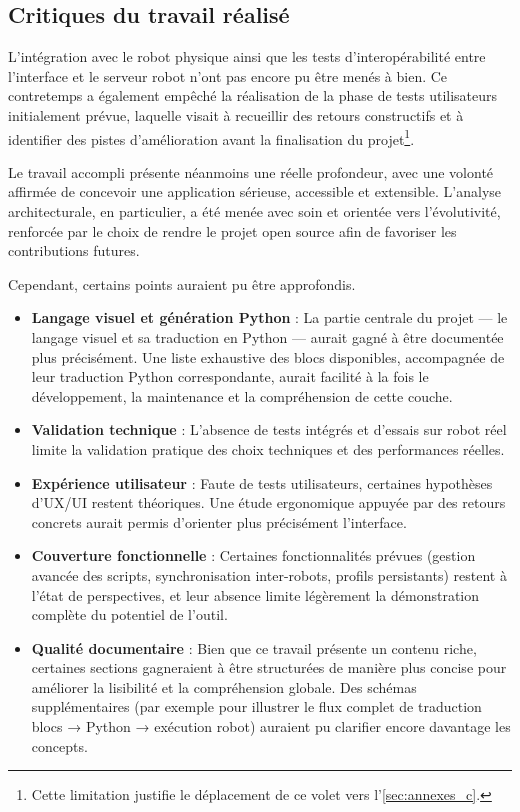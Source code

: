 \subsection{Critiques du travail réalisé} \label{sec:critiques}

L’intégration avec le robot physique ainsi que les tests d’interopérabilité entre l’interface et le serveur robot n’ont pas encore pu être menés à bien.
Ce contretemps a également empêché la réalisation de la phase de tests utilisateurs initialement prévue, laquelle visait à recueillir des retours constructifs et à identifier des pistes d’amélioration avant la finalisation du projet\footnote{Cette limitation justifie le déplacement de ce volet vers l'\autoref{sec:annexes_c}.}.

Le travail accompli présente néanmoins une réelle profondeur, avec une volonté affirmée de concevoir une application sérieuse, accessible et extensible.  
L’analyse architecturale, en particulier, a été menée avec soin et orientée vers l’évolutivité, renforcée par le choix de rendre le projet open source afin de favoriser les contributions futures.

Cependant, certains points auraient pu être approfondis.
\begin{itemize}
    \item \textbf{Langage visuel et génération Python} :  
    La partie centrale du projet — le langage visuel et sa traduction en Python — aurait gagné à être documentée plus précisément.  
    Une liste exhaustive des blocs disponibles, accompagnée de leur traduction Python correspondante, aurait facilité à la fois le développement, la maintenance et la compréhension de cette couche.
    
    \item \textbf{Validation technique} :  
    L’absence de tests intégrés et d’essais sur robot réel limite la validation pratique des choix techniques et des performances réelles.
    
    \item \textbf{Expérience utilisateur} :  
    Faute de tests utilisateurs, certaines hypothèses d’UX/UI restent théoriques. Une étude ergonomique appuyée par des retours concrets aurait permis d’orienter plus précisément l’interface.
    
    \item \textbf{Couverture fonctionnelle} :  
    Certaines fonctionnalités prévues (gestion avancée des scripts, synchronisation inter-robots, profils persistants) restent à l’état de perspectives, et leur absence limite légèrement la démonstration complète du potentiel de l’outil.
    
    \item \textbf{Qualité documentaire} :  
    Bien que ce travail présente un contenu riche, certaines sections gagneraient à être structurées de manière plus concise pour améliorer la lisibilité et la compréhension globale. 
    Des schémas supplémentaires (par exemple pour illustrer le flux complet de traduction blocs → Python → exécution robot) auraient pu clarifier encore davantage les concepts.
\end{itemize}

